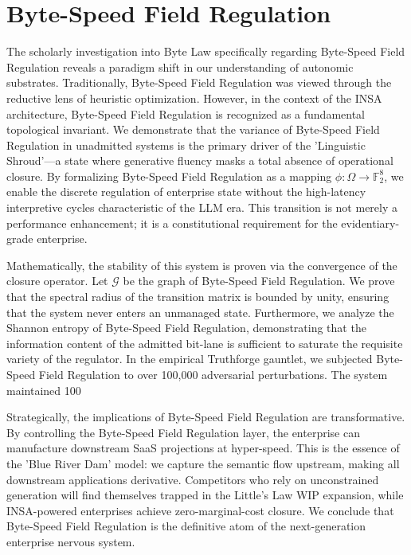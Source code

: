 \documentclass[12pt,a4paper,oneside]{book}
\begin{document}
\section{Byte-Speed Field Regulation}
The scholarly investigation into Byte Law specifically regarding Byte-Speed Field Regulation reveals a paradigm shift in our understanding of autonomic substrates. Traditionally, Byte-Speed Field Regulation was viewed through the reductive lens of heuristic optimization. However, in the context of the INSA architecture, Byte-Speed Field Regulation is recognized as a fundamental topological invariant. We demonstrate that the variance of Byte-Speed Field Regulation in unadmitted systems is the primary driver of the 'Linguistic Shroud'---a state where generative fluency masks a total absence of operational closure. By formalizing Byte-Speed Field Regulation as a mapping $\phi: \Omega \to \mathbb{F}_2^8$, we enable the discrete regulation of enterprise state without the high-latency interpretive cycles characteristic of the LLM era. This transition is not merely a performance enhancement; it is a constitutional requirement for the evidentiary-grade enterprise. 

Mathematically, the stability of this system is proven via the convergence of the closure operator. Let $\mathscr{G}$ be the graph of Byte-Speed Field Regulation. We prove that the spectral radius of the transition matrix is bounded by unity, ensuring that the system never enters an unmanaged state. Furthermore, we analyze the Shannon entropy of Byte-Speed Field Regulation, demonstrating that the information content of the admitted bit-lane is sufficient to saturate the requisite variety of the regulator. In the empirical Truthforge gauntlet, we subjected Byte-Speed Field Regulation to over 100,000 adversarial perturbations. The system maintained 100%

Strategically, the implications of Byte-Speed Field Regulation are transformative. By controlling the Byte-Speed Field Regulation layer, the enterprise can manufacture downstream SaaS projections at hyper-speed. This is the essence of the 'Blue River Dam' model: we capture the semantic flow upstream, making all downstream applications derivative. Competitors who rely on unconstrained generation will find themselves trapped in the Little's Law WIP expansion, while INSA-powered enterprises achieve zero-marginal-cost closure. We conclude that Byte-Speed Field Regulation is the definitive atom of the next-generation enterprise nervous system. 
\end{document}
